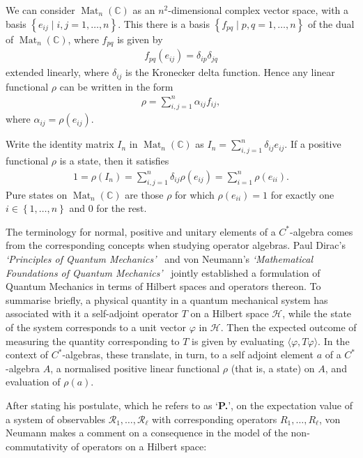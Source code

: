 \documentclass[11pt,a4paper]{report}
\theoremstyle{plain}
\theoremstyle{definition}
\newcommand{\1}{\mathbbm{1}}
\newcommand{\C}{\mathbb{C}}
\renewcommand{\H}{\mathcal{H}}
\renewcommand{\phi}{\varphi}
\DeclareMathOperator{\Mat}{\operatorname{Mat}}
\begin{document}
We can consider $\Mat_n(\C)$ as an $n^2$-dimensional complex vector space, with 
a basis $\left\{e_{ij} \mid i,j =1,\dots,n\right\}$. This there is a basis 
$\left\{f_{pq} \mid p,q =1,\dots,n\right\}$ of the dual of $\Mat_n(\C)$, where 
$f_{pq}$ is given by 
\begin{align*}
	f_{pq}(e_{ij}) = \delta_{ip}\delta_{jq}
\end{align*}
extended linearly, where $\delta_{ij}$ is the Kronecker delta function. Hence 
any linear functional $\rho$ can be written in the form
\begin{align*}
	\rho = \sum_{i,j=1}^n \alpha_{ij}f_{ij},
\end{align*}
where $\alpha_{ij}=\rho(e_{ij})$.

Write the identity matrix $I_n$ in $\Mat_n(\C)$ as $I_n =
\sum_{i,j=1}^n\delta_{ij}e_{ij}$. If a positive functional $\rho$ is a state, 
then it satisfies
\begin{align*}
	1 = \rho(I_n) = \sum_{i,j=1}^n\delta_{ij}\rho(e_{ij}) = \sum_{i=1}^n\rho(e_{ii}).
\end{align*}
Pure states on $\Mat_n(\C)$ are those $\rho$ for which $\rho(e_{ii})=1$ for 
exactly one $i \in \left\{1,\dots,n\right\}$ and $0$ for the rest.




The terminology for normal, positive and unitary elements of a $C^\ast$-algebra 
comes from the corresponding concepts when studying operator algebras. 
Paul Dirac's \emph{`Principles of Quantum Mechanics'}~\cite{dirac} and von 
Neumann's \emph{`Mathematical Foundations of Quantum Mechanics'}~\cite{vonneumann32} 
jointly established a formulation of Quantum Mechanics in 
terms of Hilbert spaces and operators thereon. To summarise briefly, a physical 
quantity in a quantum mechanical system has associated with it a self-adjoint 
operator $T$ on a Hilbert space $\H$,  while the state of the system corresponds 
to a unit vector $\phi$ in $\H$. Then the expected outcome of measuring the 
quantity corresponding to $T$ is given by evaluating $\langle\phi, 
T\phi\rangle$. In the context of $C^\ast$-algebras, these translate, in turn, to 
a self adjoint element $a$ of a $C^\ast$-algebra $A$, a normalised positive 
linear functional $\rho$ (that is, a state) on $A$, and evaluation of $\rho(a)$.


After stating his postulate, which he refers to as `\textbf{P.}', on the 
expectation value of a system of observables 
$\mathscr{R_1},\dots,\mathscr{R_\ell}$ with corresponding operators $R_1,\dots, 
R_\ell$, von Neumann makes a comment on a consequence in the model of the 
non-commutativity of operators on a Hilbert space:
\end{document}
